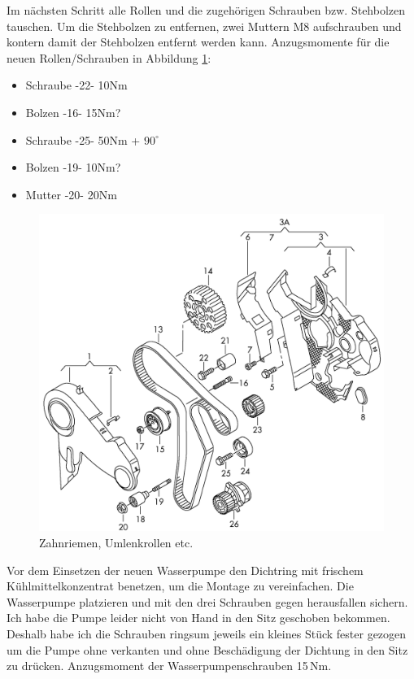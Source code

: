 \documentclass[twoside,a4paper]{refart}
\begin{document}
Im nächsten Schritt alle Rollen und die zugehörigen Schrauben bzw. Stehbolzen tauschen. Um die Stehbolzen zu entfernen, zwei Muttern M8 aufschrauben und kontern damit  der Stehbolzen entfernt werden kann.
Anzugsmomente für die neuen Rollen/Schrauben in Abbildung \ref{fig:zahnriemen}:
\begin{itemize}
	\item Schraube -22- 10Nm
	\item Bolzen -16- 15Nm?
	\item Schraube -25- 50Nm + $90^\circ$
	\item Bolzen -19- 10Nm?
	\item Mutter -20- 20Nm
\end{itemize}
\begin{figure}[htb]
	\begin{center}
		\includegraphics[width=\textwidth]{Zahnriemen}
		\caption{Zahnriemen, Umlenkrollen etc.}
		\label{fig:zahnriemen}
	\end{center}
\end{figure}
Vor dem Einsetzen der neuen Wasserpumpe den Dichtring mit frischem Kühlmittelkonzentrat benetzen, um die Montage zu vereinfachen. Die Wasserpumpe platzieren und mit den drei Schrauben gegen herausfallen sichern. Ich habe die Pumpe leider nicht von Hand in den Sitz geschoben bekommen. Deshalb habe ich die Schrauben ringsum jeweils ein kleines Stück fester gezogen um die Pumpe ohne verkanten und ohne Beschädigung der Dichtung in den Sitz zu drücken. Anzugsmoment der Wasserpumpenschrauben 15\,Nm.
\end{document}
